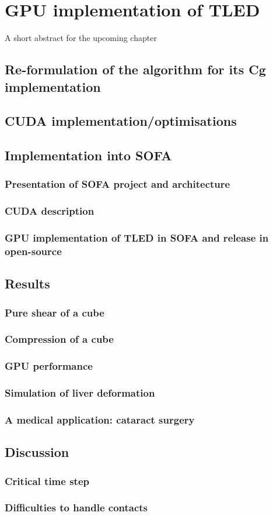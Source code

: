 \chapter{GPU implementation of TLED}
\label{chap6}
\begin{shortAbstract}
A short abstract for the upcoming chapter
\end{shortAbstract}

\section{Re-formulation of the algorithm for its Cg implementation}
		
\section{CUDA implementation/optimisations }
	
\section{Implementation into SOFA}
	\subsection{Presentation of SOFA project and architecture}
	\subsection{CUDA description}
	\subsection{GPU implementation of TLED in SOFA and release in open-source}
	
\section{Results}	
	\subsection{Pure shear of a cube}
	\subsection{Compression of a cube}
	\subsection{GPU performance}
	\subsection{Simulation of liver deformation}
	\subsection{A medical application: cataract surgery}
	
\section{Discussion}
	\subsection{Critical time step}
	\subsection{Difficulties to handle contacts}